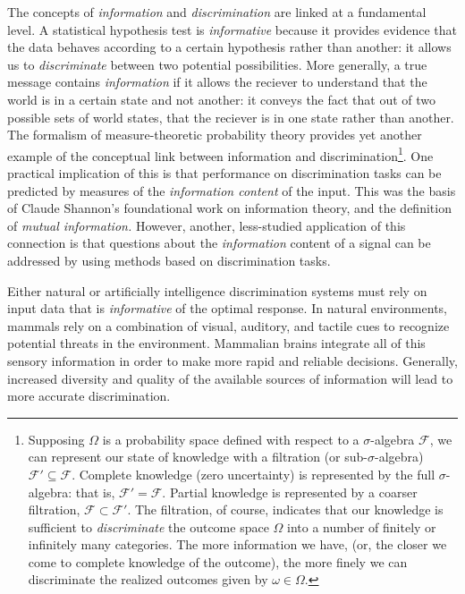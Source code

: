 The concepts of \emph{information} and \emph{discrimination} are
linked at a fundamental level.  A statistical hypothesis test is
\emph{informative} because it provides evidence that the data behaves
according to a certain hypothesis rather than another: it allows us to
\emph{discriminate} between two potential possibilities.  More
generally, a true message contains \emph{information} if it allows the
reciever to understand that the world is in a certain state and not
another: it conveys the fact that out of two possible sets of world
states, that the reciever is in one state rather than another.  The
formalism of measure-theoretic probability theory provides yet another
example of the conceptual link between information and
discrimination\footnote{Supposing $\Omega$ is a probability space
  defined with respect to a $\sigma$-algebra $\mathcal{F}$, we can
  represent our state of knowledge with a filtration (or
  sub-$\sigma$-algebra) $\mathcal{F}' \subseteq \mathcal{F}$.
  Complete knowledge (zero uncertainty) is represented by the full
  $\sigma$-algebra: that is, $\mathcal{F}' = \mathcal{F}$.  Partial
  knowledge is represented by a coarser filtration, $\mathcal{F}
  \subset \mathcal{F}'$.  The filtration, of course, indicates that
  our knowledge is sufficient to \emph{discriminate} the outcome space
  $\Omega$ into a number of finitely or infinitely many categories.
  The more information we have, (or, the closer we come to complete
  knowledge of the outcome), the more finely we can discriminate the
  realized outcomes given by $\omega \in \Omega$.}.
One practical implication of this is that performance on
discrimination tasks can be predicted by measures of the
\emph{information content} of the input. This was the basis of Claude
Shannon's foundational work on information theory, and the definition
of \emph{mutual information.}  However, another, less-studied
application of this connection is that questions about the
\emph{information} content of a signal can be addressed by using
methods based on discrimination tasks.  




Either natural or artificially intelligence discrimination systems
must rely on input data that is \emph{informative} of the optimal
response.  In natural environments, mammals rely on a combination of
visual, auditory, and tactile cues to recognize potential threats in
the environment.  Mammalian brains integrate all of this sensory
information in order to make more rapid and reliable decisions.
Generally, increased diversity and quality of the available sources of
information will lead to more accurate discrimination.

